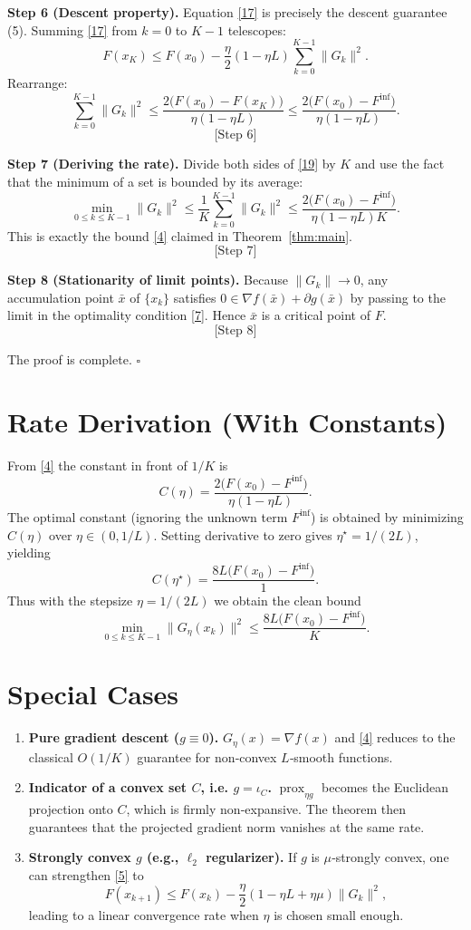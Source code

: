 \documentclass{article}
\newcommand{\prox}{\operatorname{prox}}
\newcommand{\grad}{\nabla}
\begin{document}
\noindent\textbf{Step 6 (Descent property).}  
Equation \eqref{17} is precisely the descent guarantee (5).  Summing \eqref{17} from $k=0$ to $K-1$ telescopes:
\[
F(x_{K})\le F(x_{0})-\frac{\eta}{2}(1-\eta L)\sum_{k=0}^{K-1}\|G_{k}\|^{2}.
\tag{18}
\] 
Rearrange:
\[
\sum_{k=0}^{K-1}\|G_{k}\|^{2}
\le \frac{2\bigl(F(x_{0})-F(x_{K})\bigr)}{\eta(1-\eta L)}
\le \frac{2\bigl(F(x_{0})-F^{\inf}\bigr)}{\eta(1-\eta L)} .
\tag{19}
\] 
\[
\text{[Step 6]}
\]

\noindent\textbf{Step 7 (Deriving the rate).}  
Divide both sides of \eqref{19} by $K$ and use the fact that the minimum of a set is bounded by its average:
\[
\min_{0\le k\le K-1}\|G_{k}\|^{2}
\le \frac{1}{K}\sum_{k=0}^{K-1}\|G_{k}\|^{2}
\le \frac{2\bigl(F(x_{0})-F^{\inf}\bigr)}{\eta(1-\eta L)K}.
\tag{20}
\] 
This is exactly the bound \eqref{4} claimed in Theorem~\ref{thm:main}.
\[
\text{[Step 7]}
\]

\noindent\textbf{Step 8 (Stationarity of limit points).}  
Because $\|G_{k}\|\to0$, any accumulation point $\bar x$ of $\{x_{k}\}$ satisfies $0\in\grad f(\bar x)+\partial g(\bar x)$ by passing to the limit in the optimality condition \eqref{7}. Hence $\bar x$ is a critical point of $F$.
\[
\text{[Step 8]}
\]

The proof is complete. $\square$

\section*{Rate Derivation (With Constants)}
From \eqref{4} the constant in front of $1/K$ is 
\[
C(\eta)=\frac{2\bigl(F(x_{0})-F^{\inf}\bigr)}{\eta(1-\eta L)}.
\] 
The optimal constant (ignoring the unknown term $F^{\inf}$) is obtained by minimizing $C(\eta)$ over $\eta\in(0,1/L)$. Setting derivative to zero gives $\eta^{\star}=1/(2L)$, yielding
\[
C(\eta^{\star}) = \frac{8L\bigl(F(x_{0})-F^{\inf}\bigr)}{1}.
\] 
Thus with the stepsize $\eta=1/(2L)$ we obtain the clean bound
\[
\min_{0\le k\le K-1}\|G_{\eta}(x_{k})\|^{2}\le \frac{8L\bigl(F(x_{0})-F^{\inf}\bigr)}{K}.
\]

\section*{Special Cases}
\begin{enumerate}[noitemsep,leftmargin=*]
\item \textbf{Pure gradient descent ($g\equiv0$).}  
$G_{\eta}(x)=\grad f(x)$ and \eqref{4} reduces to the classical $O(1/K)$ guarantee for non‑convex $L$‑smooth functions.
\item \textbf{Indicator of a convex set $C$, i.e. $g=\iota_{C}$.}  
$\prox_{\eta g}$ becomes the Euclidean projection onto $C$, which is firmly non‑expansive. The theorem then guarantees that the projected gradient norm vanishes at the same rate.
\item \textbf{Strongly convex $g$ (e.g., $\ell_{2}$ regularizer).}  
If $g$ is $\mu$‑strongly convex, one can strengthen \eqref{5} to 
\[
F(x_{k+1})\le F(x_{k})-\frac{\eta}{2}(1-\eta L+\eta\mu)\|G_{k}\|^{2},
\]
leading to a linear convergence rate when $\eta$ is chosen small enough.
\end{enumerate}
\end{document}
